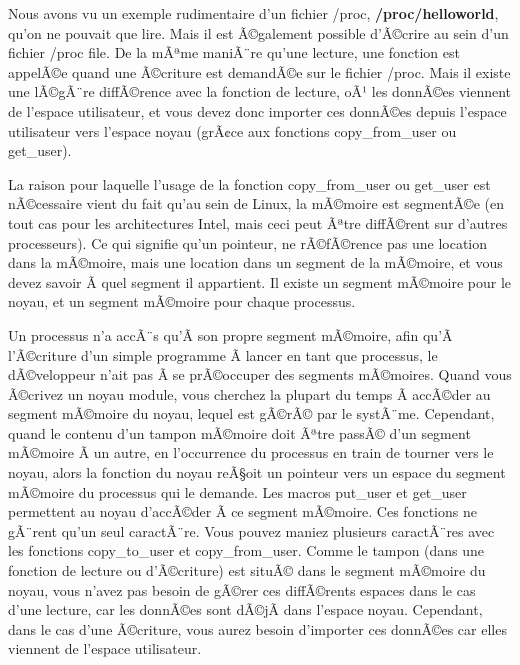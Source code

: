 \documentclass[11pt]{article}
\begin{document}
Nous avons vu un exemple rudimentaire d'un fichier /proc, \textbf{/proc/helloworld}, qu'on ne pouvait que lire. Mais il est Ã©galement possible d'Ã©crire au sein d'un fichier /proc file. De la mÃªme maniÃ¨re qu'une lecture, une fonction est appelÃ©e quand une Ã©criture est demandÃ©e sur le fichier /proc. Mais il existe une lÃ©gÃ¨re diffÃ©rence avec la fonction de lecture, oÃ¹ les donnÃ©es viennent de l'espace utilisateur, et vous devez donc importer ces donnÃ©es depuis l'espace utilisateur vers l'espace noyau (grÃ¢ce aux fonctions copy\_from\_user ou get\_user).

La raison pour laquelle l'usage de la fonction copy\_from\_user ou get\_user est nÃ©cessaire vient du fait qu'au sein de Linux, la mÃ©moire est segmentÃ©e (en tout cas pour les architectures Intel, mais ceci peut Ãªtre diffÃ©rent sur d'autres processeurs). Ce qui signifie qu'un pointeur, ne rÃ©fÃ©rence pas une location dans la mÃ©moire, mais une location dans un segment de la mÃ©moire, et vous devez savoir Ã  quel segment il appartient. Il existe un segment mÃ©moire pour le noyau, et un segment mÃ©moire pour chaque processus.

Un processus n'a accÃ¨s qu'Ã  son propre segment mÃ©moire, afin qu'Ã  l'Ã©criture d'un simple programme Ã  lancer en tant que processus, le dÃ©veloppeur n'ait pas Ã  se prÃ©occuper des segments mÃ©moires. Quand vous Ã©crivez un noyau module, vous cherchez la plupart du temps Ã  accÃ©der au segment mÃ©moire du noyau, lequel est gÃ©rÃ© par le systÃ¨me. Cependant, quand le contenu d'un tampon mÃ©moire doit Ãªtre passÃ© d'un segment mÃ©moire Ã  un autre, en l'occurrence du processus en train de tourner vers le noyau, alors la fonction du noyau reÃ§oit un pointeur vers un espace du segment mÃ©moire du processus qui le demande. Les macros put\_user et get\_user permettent au noyau d'accÃ©der Ã  ce segment mÃ©moire. Ces fonctions ne gÃ¨rent qu'un seul caractÃ¨re. Vous pouvez maniez plusieurs caractÃ¨res avec les fonctions copy\_to\_user et copy\_from\_user. Comme le tampon (dans une fonction de lecture ou d'Ã©criture) est situÃ© dans le segment mÃ©moire du noyau, vous n'avez pas besoin de gÃ©rer ces diffÃ©rents espaces dans le cas d'une lecture, car les donnÃ©es sont dÃ©jÃ  dans l'espace noyau. Cependant, dans le cas d'une Ã©criture, vous aurez besoin d'importer ces donnÃ©es car elles viennent de l'espace utilisateur.
\end{document}
